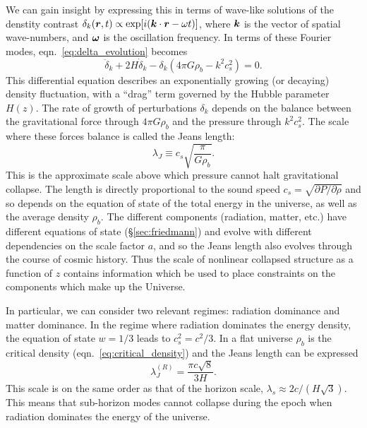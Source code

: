 We can gain insight by expressing this in terms of
wave-like solutions of the denstity contrast
$\delta_k(\boldsymbol{r}, t) \propto \exp[i(\boldsymbol{k}\cdot\boldsymbol{r} - \omega t)]$,
where $\boldsymbol{k}$ is the vector of spatial wave-numbers, and $\boldsymbol{\omega}$
is the oscillation frequency.  In terms of these Fourier modes,
eqn.~\ref{eq:delta_evolution} becomes
\begin{equation}
  \label{eq:delta_evolution_k}
  \ddot{\delta}_k + 2 H \dot{\delta}_k - \delta_k(4\pi G\rho_b - k^2c_s^2) = 0.
\end{equation}
This differential equation describes an exponentially growing (or decaying)
density fluctuation, with a ``drag'' term governed by the Hubble parameter
$H(z)$.  The rate of growth of perturbations $\delta_k$ depends
on the balance between the gravitational force through $4\pi G\rho_b$ and the
pressure through $k^2c_s^2$.  The scale where these forces balance
is called the Jeans length:
\begin{equation}
  \label{eq:jeans_length}
  \lambda_J \equiv c_s \sqrt{\frac{\pi}{G\rho_b}}.
\end{equation}
This is the approximate scale above which pressure cannot halt gravitational
collapse.  The length is directly proportional to the sound speed
$c_s = \sqrt{\partial P/\partial \rho}$ and so depends on the equation of
state of the total energy in the universe,
as well as the average density $\rho_b$.
The different components (radiation, matter, etc.) have different
equations of state (\S\ref{sec:friedmann}) and evolve
with different dependencies on the scale factor
$a$, and so the Jeans length also evolves through the course of cosmic
history.  Thus the scale of nonlinear
collapsed structure as a function of $z$ contains information which
be used to place constraints on the components which make up the Universe.

In particular, we can consider two relevant regimes: radiation dominance
and matter dominance.  In the regime where radiation dominates the energy
density, the equation of state $w=1/3$ leads to $c_s^2 = c^2/3$.  In a flat
universe $\rho_b$ is the critical density (eqn.~\ref{eq:critical_density})
and the Jeans length can be expressed
\begin{equation}
  \label{eq:jeans_radiation}
  \lambda_J^{(R)} = \frac{\pi c \sqrt{8}}{3 H}.
\end{equation}
This scale is on the same order as that of the horizon scale,
$\lambda_s \approx 2c / (H\sqrt{3})$.  This means that sub-horizon modes
cannot collapse during the epoch when radiation dominates the energy
of the universe.

